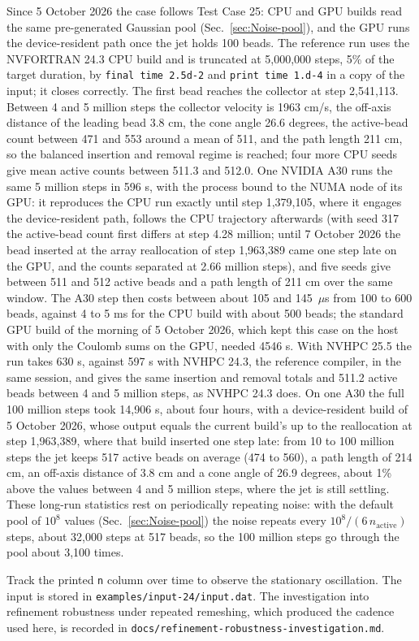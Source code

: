 Since 5 October 2026 the case follows Test Case 25: CPU and GPU builds read
the same pre-generated Gaussian pool (Sec.~\ref{sec:Noise-pool}), and the GPU
runs the device-resident path once the jet holds 100 beads.  The reference
run uses the NVFORTRAN 24.3 CPU build and is truncated at 5,000,000 steps, 5\%
of the target duration, by \texttt{final time 2.5d-2} and
\texttt{print time 1.d-4} in a copy of the input; it closes correctly.  The
first bead reaches the
collector at step 2,541,113.  Between 4 and 5 million steps the collector
velocity is 1963 cm/s, the off-axis distance of the leading bead 3.8 cm, the
cone angle 26.6 degrees, the active-bead count between 471 and 553 around a
mean of 511, and the path length 211 cm, so the balanced insertion and removal
regime is reached; four more CPU seeds give mean active counts between 511.3
and 512.0.  One NVIDIA
A30 runs the same 5 million steps in 596 s, with the process bound to the
NUMA node of its GPU: it reproduces the CPU run
exactly until step 1,379,105, where it engages the device-resident path,
follows the CPU trajectory afterwards (with seed 317 the active-bead count
first differs at step 4.28 million; until 7 October 2026 the bead inserted at
the array reallocation of step 1,963,389 came one step late on the GPU, and
the counts separated at 2.66 million steps), and five seeds give between 511
and 512 active beads and a path length of 211 cm over the same window.  The
A30 step then costs between about 105 and 145~$\mu$s from 100 to 600 beads,
against 4 to 5 ms for the CPU build with about 500 beads; the standard GPU
build of the morning of 5 October 2026, which kept this case on the host
with only the Coulomb sums on the GPU, needed 4546 s.  With NVHPC 25.5 the
run takes 630 s, against 597 s with NVHPC 24.3, the reference compiler, in
the same session, and gives the same insertion and removal totals and 511.2
active beads between 4 and 5 million steps, as NVHPC 24.3 does.  On one A30
the full 100 million steps took 14,906 s, about four hours, with a
device-resident build of 5 October 2026, whose output equals the current build's up to the
reallocation at step 1,963,389, where that build inserted one step late:
from 10 to 100 million steps the jet keeps 517 active beads on average
(474 to 560), a path length of 214 cm, an off-axis distance of 3.8 cm and a
cone angle of 26.9 degrees, about 1\% above the values between 4 and 5
million steps, where the jet is still settling.  These long-run statistics
rest on periodically repeating noise: with the default pool of $10^{8}$
values (Sec.~\ref{sec:Noise-pool}) the noise repeats every
$10^{8}/(6\,n_{\mathrm{active}})$ steps, about 32,000 steps at 517 beads, so
the 100 million steps go through the pool about 3,100 times.

Track the printed \texttt{n} column over time to observe the stationary
oscillation.  The input is stored in
\texttt{examples/input-24/input.dat}.  The investigation into refinement
robustness under repeated remeshing, which produced the cadence used here, is
recorded in \texttt{docs/refinement-robustness-investigation.md}.
